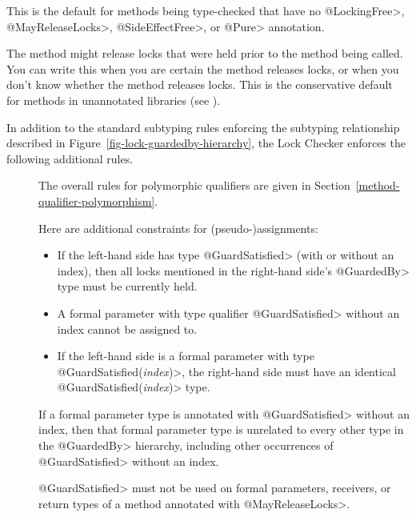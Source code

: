 \begin{sloppypar}
\begin{description}
  This is the default for methods being type-checked that have no \<@LockingFree>,
  \<@MayReleaseLocks>, \<@SideEffectFree>, or \<@Pure>
  annotation.

\item[\refqualclass{checker/lock/qual}{MayReleaseLocks}]
  The method might release locks that were held prior to the method being called.
  You can write this when you are certain the method releases locks, or
  when you don't know whether the method releases locks.
  This is the conservative default for methods in unannotated libraries (see ).

\end{description}
\end{sloppypar}



In addition to the standard subtyping rules enforcing the subtyping relationship
described in Figure~\ref{fig-lock-guardedby-hierarchy}, the Lock Checker enforces
the following additional rules.



\begin{description}

\item[]

  The overall rules for polymorphic qualifiers are given in
  Section~\ref{method-qualifier-polymorphism}.

  Here are additional constraints for (pseudo-)assignments:

  \begin{itemize}
  \item
    If the left-hand side has type \<@GuardSatisfied> (with or without an index),
    then all locks mentioned in the right-hand side's \<@GuardedBy> type
    must be currently held.
  \item
    A formal parameter with type qualifier \<@GuardSatisfied> without an
    index cannot be assigned to.
  \item
    If the left-hand side is a formal parameter with type
    \<@GuardSatisfied(\emph{index})>, the right-hand side must have
    an identical \<@GuardSatisfied(\emph{index})> type.
  \end{itemize}

  If a formal parameter type is
  annotated with \<@GuardSatisfied> without an index, then that formal parameter
  type is unrelated to every other type in the \<@GuardedBy> hierarchy,
  including other occurrences of \<@GuardSatisfied> without an index.

  \<@GuardSatisfied> must not be used on formal parameters, receivers, or
  return types of a method annotated with \<@MayReleaseLocks>.
\end{description}

